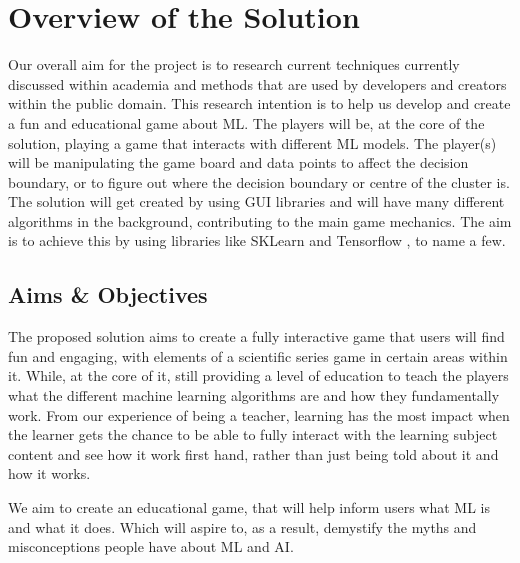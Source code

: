 	\section{Overview of the Solution}
		\label{sec:overview_of_solution}
		Our overall aim for the project is to research current techniques currently discussed within academia and methods that are used by developers and creators within the public domain. This research intention is to help us develop and create a fun and educational game about ML. The players will be, at the core of the solution, playing a game that interacts with different ML models. The player(s) will be manipulating the game board and data points to affect the decision boundary, or to figure out where the decision boundary or centre of the cluster is. The solution will get created by using  GUI libraries and will have many different algorithms in the background, contributing to the main game mechanics. The aim is to achieve this by using libraries like SKLearn \cite{sklearn_api} and Tensorflow \cite{tensorflow2015-whitepaper}, to name a few.
	
		
	
	
	
		
		
	
	\subsection{Aims \& Objectives}
		\label{sec:intro_objective} 
		The proposed solution aims to create a fully interactive game that users will find fun and engaging, with elements of a scientific series game in certain areas within it. While, at the core of it, still providing a level of education to teach the players what the different machine learning algorithms are and how they fundamentally work. From our experience of being a teacher, learning has the most impact when the learner gets the chance to be able to fully interact with the learning subject content and see how it work first hand, rather than just being told about it and how it works. 
		
		We aim to create an educational game, that will help inform users what ML is and what it does. Which will aspire to, as a result, demystify the myths and misconceptions people have about ML and AI.
	
